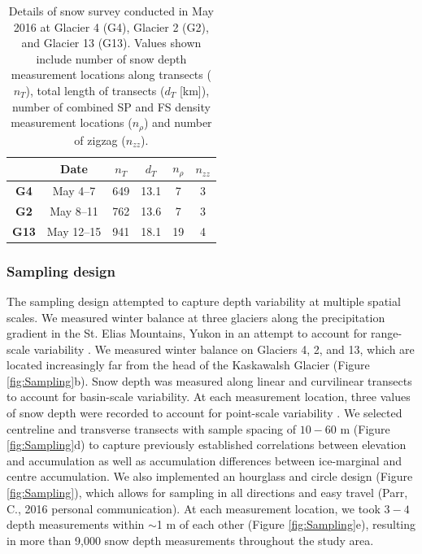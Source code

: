 \documentclass[review,oneside, letterpaper]{igs}
\begin{document}
\begin{table}[]
\centering
\caption{Details of snow survey conducted in May 2016 at Glacier 4 (G4), Glacier 2 (G2), and Glacier 13 (G13). Values shown include number of snow depth measurement locations along transects ($n_{T}$), total length of transects ($d_T$ [km]), number of combined SP and FS density measurement locations ($n_{\rho}$) and number of zigzag ($n_{zz}$). }
\label{tab:SurveyDetails}
\begin{tabular}{cccccc}
\midrule
\textbf{} & \textbf{Date} & \textbf{$n_{T}$} & \textbf{$d_T$} & \textbf{$n_{\rho}$} & \textbf{$n_{zz}$} \\ \midrule
\textbf{G4} & May 4--7 & 649 & 13.1 & 7 & 3 \\
\textbf{G2} & May 8--11 & 762 & 13.6 & 7 & 3 \\
\textbf{G13} & May 12--15 & 941 & 18.1 & 19 & 4
\end{tabular}
\end{table}

\subsubsection{Sampling design}

The sampling design attempted to capture depth variability at multiple spatial scales. We measured winter balance at three glaciers along the precipitation gradient in the St. Elias Mountains, Yukon \citep{Taylor1969} in an attempt to account for range-scale variability \citep{Clark2011}. We measured winter balance on Glaciers 4, 2, and 13, which are located increasingly far from the head of the Kaskawalsh Glacier (Figure \ref{fig:Sampling}b). Snow depth was measured along linear and curvilinear transects to account for basin-scale variability. At each measurement location, three values of snow depth were recorded to account for point-scale variability \citep{Clark2011}.  We selected centreline and transverse transects with sample spacing of $10-60$ m (Figure \ref{fig:Sampling}d) to capture previously established correlations between elevation and accumulation \citep[e.g.][]{Machguth2006, Walmsley2015} as well as accumulation differences between ice-marginal and centre accumulation. We also implemented an hourglass and circle design (Figure \ref{fig:Sampling}), which allows for sampling in all directions and easy travel (Parr, C., 2016 personal communication). At each measurement location, we took $3-4$ depth measurements within $\sim$1 m of each other (Figure \ref{fig:Sampling}e), resulting in more than 9,000 snow depth measurements throughout the study area. 
\end{document}
